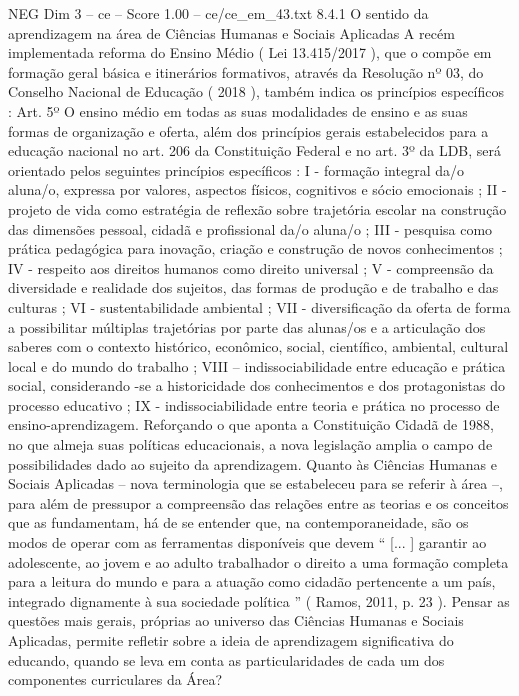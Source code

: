 \begin{textsample}{NEG Dim 3 – ce – Score 1.00 – ce/ce\_em\_43.txt}  \label{ex:f3_neg_232}
8.4.1 O sentido da aprendizagem na área de Ciências Humanas e Sociais Aplicadas A recém implementada reforma do Ensino Médio ( Lei 13.415/2017 ), que o compõe em formação geral básica e itinerários formativos, através da Resolução nº 03, do Conselho Nacional de Educação ( 2018 ), também indica os princípios específicos : Art. 5º O ensino médio em todas as suas modalidades de ensino e as suas formas de organização e oferta, além dos princípios gerais estabelecidos para a educação nacional no art. 206 da Constituição Federal e no art. 3º da LDB, será orientado pelos seguintes princípios específicos : I - formação integral da/o aluna/o, expressa por valores, aspectos físicos, cognitivos e sócio emocionais ; II - projeto de vida como estratégia de reflexão sobre trajetória escolar na construção das dimensões pessoal, cidadã e profissional da/o aluna/o ; III - pesquisa como prática pedagógica para inovação, criação e construção de novos conhecimentos ; IV - respeito aos direitos humanos como direito universal ; V - compreensão da diversidade e realidade dos sujeitos, das formas de produção e de trabalho e das culturas ; VI - sustentabilidade ambiental ; VII - diversificação da oferta de forma a possibilitar múltiplas trajetórias por parte das alunas/os e a articulação dos saberes com o contexto histórico, econômico, social, científico, ambiental, cultural local e do mundo do trabalho ; VIII – indissociabilidade entre educação e prática social, considerando -se a historicidade dos conhecimentos e dos protagonistas do processo educativo ; IX - indissociabilidade entre teoria e prática no processo de ensino-aprendizagem.
Reforçando o que aponta a Constituição Cidadã de 1988, no que almeja suas políticas educacionais, a nova legislação amplia o campo de possibilidades dado ao sujeito da aprendizagem.
Quanto às Ciências Humanas e Sociais Aplicadas – nova terminologia que se estabeleceu para se referir à área –, para além de pressupor a compreensão das relações entre as teorias e os conceitos que as fundamentam, há de se entender que, na contemporaneidade, são os modos de operar com as ferramentas disponíveis que devem “ [... ] garantir ao adolescente, ao jovem e ao adulto trabalhador o direito a uma formação completa para a leitura do mundo e para a atuação como cidadão pertencente a um país, integrado dignamente à sua sociedade política ” ( Ramos, 2011, p. 23 ).
Pensar as questões mais gerais, próprias ao universo das Ciências Humanas e Sociais Aplicadas, permite refletir sobre a ideia de aprendizagem significativa do educando, quando se leva em conta as particularidades de cada um dos componentes curriculares da Área?

\end{textsample}
